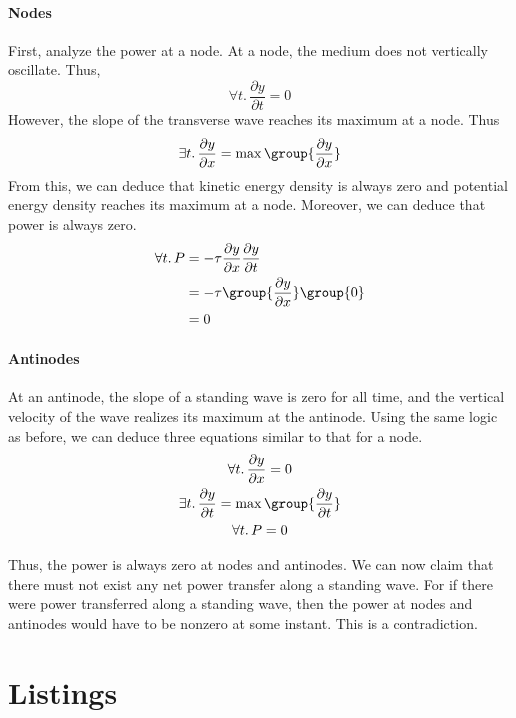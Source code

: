 \documentclass{hw}
\numberwithin{equation}{section}
\begin{document}
\paragraph{Nodes} First, analyze the power at a node. At a node, the medium
does not vertically oscillate. Thus,
\begin{equation}
  \forall t.\, \frac{\partial y}{\partial t} = 0
\end{equation}
However, the slope of the transverse wave reaches its maximum at a node. Thus 
\begin{equation}
  \exists t.\, 
  \frac{\partial y}{\partial x} = \max \group{\frac{\partial y}{\partial x}}
\end{equation}
From this, we can deduce that kinetic energy density is always zero and potential
energy density reaches its maximum at a node. Moreover, we can deduce that
power is always zero.
\begin{align}
  \forall t.\, P &= -\tau \frac{\partial y}{\partial x} 
                          \frac{\partial y}{\partial t}                   \\
                 &= -\tau \group{\frac{\partial y}{\partial x}} \group{0} \\
                 &= 0
\end{align}

\paragraph{Antinodes}
At an antinode, the slope of a standing wave is zero for all time, and the
vertical velocity of the wave realizes its maximum at the antinode. Using the
same logic as before, we can deduce three equations similar to that for a node.
\begin{gather}
  \forall t.\, 
    \frac{\partial y}{\partial x} = 0 \\
  \exists t.\, 
    \frac{\partial y}{\partial t} = \max \group{\frac{\partial y}{\partial t}} \\
  \forall t.\, 
    P = 0
\end{gather}

Thus, the power is always zero at nodes and antinodes. We can now claim that
there must not exist any net power transfer along a standing wave. For if there
were power transferred along a standing wave, then the power at nodes and
antinodes would have to be nonzero at some instant. This is a contradiction.

\section{Listings}
\end{document}
